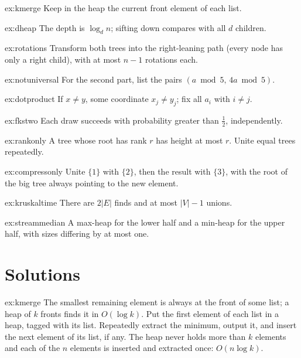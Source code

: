 \begin{hint}{ex:kmerge}
Keep in the heap the current front element of each list.
\end{hint}
\begin{hint}{ex:dheap}
The depth is $\log_dn$; sifting down compares with all $d$ children.
\end{hint}
\begin{hint}{ex:rotations}
Transform both trees into the right-leaning path (every node has only a right child), with at most $n-1$ rotations each.
\end{hint}
\begin{hint}{ex:notuniversal}
For the second part, list the pairs $(a\bmod5,\,4a\bmod5)$.
\end{hint}
\begin{hint}{ex:dotproduct}
If $x\ne y$, some coordinate $x_j\ne y_j$; fix all $a_i$ with $i\ne j$.
\end{hint}
\begin{hint}{ex:fkstwo}
Each draw succeeds with probability greater than $\frac12$, independently.
\end{hint}
\begin{hint}{ex:rankonly}
A tree whose root has rank $r$ has height at most $r$. Unite equal trees repeatedly.
\end{hint}
\begin{hint}{ex:compressonly}
Unite $\{1\}$ with $\{2\}$, then the result with $\{3\}$, with the root of the big tree always pointing to the new element.
\end{hint}
\begin{hint}{ex:kruskaltime}
There are $2|E|$ finds and at most $|V|-1$ unions.
\end{hint}
\begin{hint}{ex:streammedian}
A max-heap for the lower half and a min-heap for the upper half, with sizes differing by at most one.
\end{hint}

\section{Solutions}

\begin{solution}{ex:kmerge}
\idea The smallest remaining element is always at the front of some list; a heap of $k$ fronts finds it in $O(\log k)$.
\writeup Put the first element of each list in a heap, tagged with its list. Repeatedly extract the minimum, output it, and insert the next element of its list,
if any. The heap never holds more than $k$ elements and each of the $n$ elements is inserted and extracted once: $O(n\log k)$.
\end{solution}

